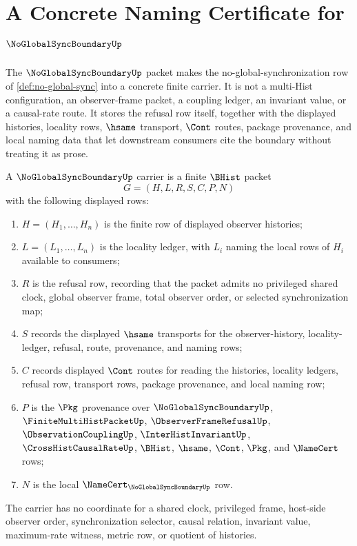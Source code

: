 \chapter{A Concrete Naming Certificate for $\NoGlobalSyncBoundaryUp$}
\label{ch:concrete-instances-noglobalsyncboundary-namecert}

The $\NoGlobalSyncBoundaryUp$ packet makes the no-global-synchronization row of \autoref{def:no-global-sync} into a concrete finite carrier. It is not a multi-Hist configuration, an observer-frame packet, a coupling ledger, an invariant value, or a causal-rate route. It stores the refusal row itself, together with the displayed histories, locality rows, $\hsame$ transport, $\Cont$ routes, package provenance, and local naming data that let downstream consumers cite the boundary without treating it as prose.

\begin{definition}
\label{def:no-global-sync-boundary-carrier}
A $\NoGlobalSyncBoundaryUp$ carrier is a finite $\BHist$ packet
$$
G=(H,L,R,S,C,P,N)
$$
with the following displayed rows:
\begin{enumerate}
\item $H=(H_1,\ldots,H_n)$ is the finite row of displayed observer histories;
\item $L=(L_1,\ldots,L_n)$ is the locality ledger, with $L_i$ naming the local rows of $H_i$ available to consumers;
\item $R$ is the refusal row, recording that the packet admits no privileged shared clock, global observer frame, total observer order, or selected synchronization map;
\item $S$ records the displayed $\hsame$ transports for the observer-history, locality-ledger, refusal, route, provenance, and naming rows;
\item $C$ records displayed $\Cont$ routes for reading the histories, locality ledgers, refusal row, transport rows, package provenance, and local naming row;
\item $P$ is the $\Pkg$ provenance over $\NoGlobalSyncBoundaryUp$, $\FiniteMultiHistPacketUp$, $\ObserverFrameRefusalUp$, $\ObservationCouplingUp$, $\InterHistInvariantUp$, $\CrossHistCausalRateUp$, $\BHist$, $\hsame$, $\Cont$, $\Pkg$, and $\NameCert$ rows;
\item $N$ is the local $\NameCert_{\NoGlobalSyncBoundaryUp}$ row.
\end{enumerate}
The carrier has no coordinate for a shared clock, privileged frame, host-side observer order, synchronization selector, causal relation, invariant value, maximum-rate witness, metric row, or quotient of histories.
\end{definition}

